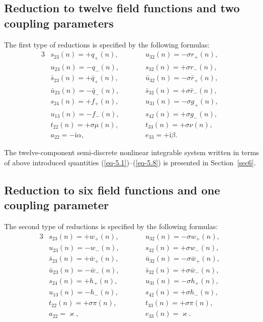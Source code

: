 \documentclass[10pt,a4paper]{amsart}
\numberwithin{equation}{section}
\begin{document}
\subsection{Reduction to twelve field functions and two coupling parameters}\label{sec5.1}
The first type of reductions is specified by the following formulas:
\begin{alignat}{3}\label{eq-5.1}
	&s_{23}(n)=+q_{+}(n), \qquad&& u_{32}(n)=-\sigma r_{+}(n),&
\\ \label{eq-5.2}
	&u_{23}(n)=-q_{-}(n), \qquad&& s_{32}(n)=+\sigma r_{-}(n),&
\\ \label{eq-5.3}
	&\bar{s}_{23}(n)=+\bar{q}_{+}(n), \qquad&& \bar{u}_{32}(n)=-\sigma \bar{r}_{+}(n),&
\\ \label{eq-5.4}
	&\bar{u}_{23}(n)=-\bar{q}_{-}(n), \qquad&& \bar{s}_{32}(n)=+\sigma \bar{r}_{-}(n),&
\\ \label{eq-5.5}
	&s_{24}(n)=+f_{+}(n), \qquad&& u_{31}(n)=-\sigma g_{+}(n),&
\\ \label{eq-5.6}
	&u_{13}(n)=-f_{-}(n), \qquad&& s_{42}(n)=+\sigma g_{-}(n),&
\\ \label{eq-5.7}
	&t_{22}(n)=+\sigma \mu(n), \qquad&& t_{33}(n)=+\sigma \nu(n),&
\\ \label{eq-5.8}
	&a_{22}=-\mathrm{i}\alpha, \qquad&& e_{33}=+\mathrm{i}\beta .&
\end{alignat}

The twelve-component semi-discrete nonlinear integrable system written in terms of above introduced quantities (\ref{eq-5.1})--(\ref{eq-5.8}) is presented in Section~\ref{sec6}.


\subsection{Reduction to six field functions and one coupling parameter}\label{sec5.2}
The second type of reductions is specified by the following formulas:
\begin{alignat}{3}\label{eq-5.9}
&s_{23}(n)=+w_{+}(n), \qquad&& u_{32}(n)=-\sigma w_{+}(n),&
\\ \label{eq-5.10}
&u_{23}(n)=-w_{-}(n), \qquad&& s_{32}(n)=+\sigma w_{-}(n),&
\\ \label{eq-5.11}
&\bar{s}_{23}(n)=+\bar{w}_{+}(n), \qquad&& \bar{u}_{32}(n)=-\sigma \bar{w}_{+}(n),&
\\ \label{eq-5.12}
&\bar{u}_{23}(n)=-\bar{w}_{-}(n), \qquad&& \bar{s}_{32}(n)=+\sigma \bar{w}_{-}(n),&
\\ \label{eq-5.13}
&s_{24}(n)=+h_{+}(n), \qquad&& u_{31}(n)=-\sigma h_{+}(n),&
\\ \label{eq-5.14}
&u_{13}(n)=-h_{-}(n), \qquad&& s_{42}(n)=+\sigma h_{-}(n),&
\\ \label{eq-5.15}
&t_{22}(n)=+\sigma \pi(n), \qquad&& t_{33}(n)=+\sigma \pi(n),&
\\ \label{eq-5.16}
&a_{22}=\varkappa, \qquad&& e_{33}(n)=\varkappa .&
\end{alignat}
\end{document}
